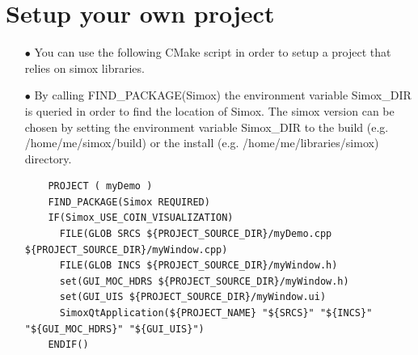 \section{Setup your own project}
\begin{itemize}
\item[$\bullet$] You can use the following CMake script in order to setup a project that relies on simox libraries. 
\item[$\bullet$] By calling FIND\_PACKAGE(Simox) the environment variable Simox\_DIR is queried in order to find the location of Simox. The simox version can be chosen by setting the environment variable Simox\_DIR to the build (e.g. /home/me/simox/build) or the install (e.g. /home/me/libraries/simox) directory. 
\begin{lstlisting}
    PROJECT ( myDemo )
    FIND_PACKAGE(Simox REQUIRED)
    IF(Simox_USE_COIN_VISUALIZATION)
      FILE(GLOB SRCS ${PROJECT_SOURCE_DIR}/myDemo.cpp ${PROJECT_SOURCE_DIR}/myWindow.cpp)
      FILE(GLOB INCS ${PROJECT_SOURCE_DIR}/myWindow.h)
      set(GUI_MOC_HDRS ${PROJECT_SOURCE_DIR}/myWindow.h)
      set(GUI_UIS ${PROJECT_SOURCE_DIR}/myWindow.ui)
      SimoxQtApplication(${PROJECT_NAME} "${SRCS}" "${INCS}" "${GUI_MOC_HDRS}" "${GUI_UIS}")
    ENDIF()
\end{lstlisting}
\end{itemize}

